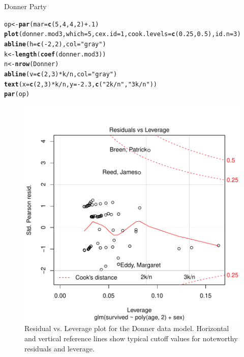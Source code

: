 \documentclass[11pt]{book}\usepackage[]{graphicx}\usepackage[]{color}
\makeatletter
\newcommand{\hlnum}[1]{\textcolor[rgb]{0.686,0.059,0.569}{#1}}%
\newcommand{\hlstr}[1]{\textcolor[rgb]{0.192,0.494,0.8}{#1}}%
\newcommand{\hlopt}[1]{\textcolor[rgb]{0,0,0}{#1}}%
\newcommand{\hlstd}[1]{\textcolor[rgb]{0.345,0.345,0.345}{#1}}%
\newcommand{\hlkwb}[1]{\textcolor[rgb]{0.69,0.353,0.396}{#1}}%
\newcommand{\hlkwc}[1]{\textcolor[rgb]{0.333,0.667,0.333}{#1}}%
\newcommand{\hlkwd}[1]{\textcolor[rgb]{0.737,0.353,0.396}{\textbf{#1}}}%
\newenvironment{kframe}{%
 \def\at@end@of@kframe{}%
 \ifinner\ifhmode%
  \def\at@end@of@kframe{\end{minipage}}%
  \begin{minipage}{\columnwidth}%
 \fi\fi%
 \def\FrameCommand##1{\hskip\@totalleftmargin \hskip-\fboxsep
 \colorbox{shadecolor}{##1}\hskip-\fboxsep
     \hskip-\linewidth \hskip-\@totalleftmargin \hskip\columnwidth}%
 \MakeFramed {\advance\hsize-\width
   \@totalleftmargin\z@ \linewidth\hsize
   \@setminipage}}%
 {\par\unskip\endMakeFramed%
 \at@end@of@kframe}
\newenvironment{knitrout}{}{} %
\renewenvironment{knitrout}{\small\renewcommand{\baselinestretch}{.85}}{} %
\makeatother
\begin{document}
\begin{Example}[donner2]{Donner Party}
\begin{knitrout}
\color{fgcolor}\begin{kframe}
\begin{alltt}
\hlstd{op} \hlkwb{<-} \hlkwd{par}\hlstd{(}\hlkwc{mar}\hlstd{=}\hlkwd{c}\hlstd{(}\hlnum{5}\hlstd{,}\hlnum{4}\hlstd{,}\hlnum{4}\hlstd{,}\hlnum{2}\hlstd{)}\hlopt{+}\hlnum{.1}\hlstd{)}
\hlkwd{plot}\hlstd{(donner.mod3,} \hlkwc{which}\hlstd{=}\hlnum{5}\hlstd{,} \hlkwc{cex.id}\hlstd{=}\hlnum{1}\hlstd{,} \hlkwc{cook.levels}\hlstd{=}\hlkwd{c}\hlstd{(}\hlnum{0.25}\hlstd{,} \hlnum{0.5}\hlstd{),} \hlkwc{id.n}\hlstd{=}\hlnum{3}\hlstd{)}
\hlkwd{abline}\hlstd{(}\hlkwc{h}\hlstd{=}\hlkwd{c}\hlstd{(}\hlopt{-}\hlnum{2}\hlstd{,} \hlnum{2}\hlstd{),} \hlkwc{col}\hlstd{=}\hlstr{"gray"}\hlstd{)}
\hlstd{k} \hlkwb{<-} \hlkwd{length}\hlstd{(}\hlkwd{coef}\hlstd{(donner.mod3))}
\hlstd{n} \hlkwb{<-} \hlkwd{nrow}\hlstd{(Donner)}
\hlkwd{abline}\hlstd{(}\hlkwc{v}\hlstd{=}\hlkwd{c}\hlstd{(}\hlnum{2}\hlstd{,} \hlnum{3}\hlstd{)}\hlopt{*}\hlstd{k}\hlopt{/}\hlstd{n,} \hlkwc{col}\hlstd{=}\hlstr{"gray"}\hlstd{)}
\hlkwd{text}\hlstd{(}\hlkwc{x}\hlstd{=}\hlkwd{c}\hlstd{(}\hlnum{2}\hlstd{,} \hlnum{3}\hlstd{)}\hlopt{*}\hlstd{k}\hlopt{/}\hlstd{n,} \hlkwc{y}\hlstd{=}\hlopt{-}\hlnum{2.3}\hlstd{,} \hlkwd{c}\hlstd{(}\hlstr{"2k/n"}\hlstd{,} \hlstr{"3k/n"}\hlstd{))}
\hlkwd{par}\hlstd{(op)}
\end{alltt}
\end{kframe}\begin{figure}[!htbp]


\centerline{\includegraphics[width=.6\textwidth]{ch07/fig/donner2-plot5-1} }

\caption[Residual vs]{Residual vs. Leverage plot for the Donner data model. Horizontal and vertical reference lines show typical cutoff values for noteworthy residuals and leverage.\label{fig:donner2-plot5}}
\end{figure}



\end{knitrout}
\end{Example}
\end{document}
